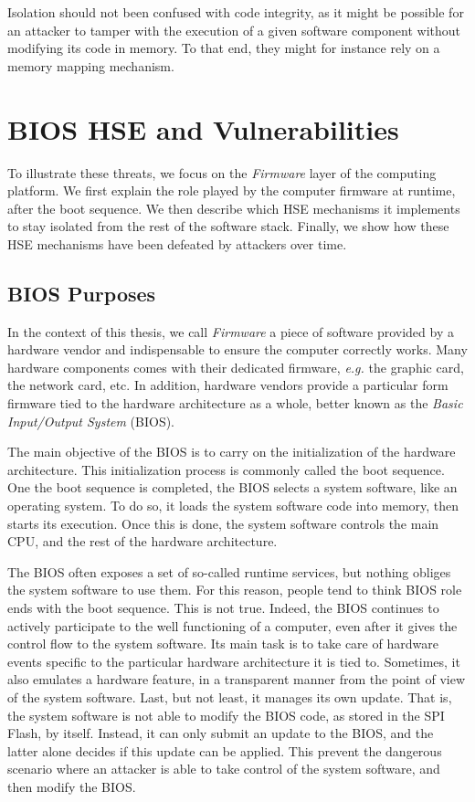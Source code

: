 Isolation should not been confused with code integrity, as it might be possible
for an attacker to tamper with the execution of a given software component
without modifying its code in memory.
%
To that end, they might for instance rely on a memory mapping mechanism.


\section{BIOS HSE and Vulnerabilities}
\label{sec:usecase:firmware}

To illustrate these threats, we focus on the \emph{Firmware} layer of the
computing platform.
%
We first explain the role played by the computer firmware at runtime, after the
boot sequence.
%
We then describe which HSE mechanisms it implements to stay isolated from the
rest of the software stack.
%
Finally, we show how these HSE mechanisms have been defeated by attackers over
time.

\subsection{BIOS Purposes}

In the context of this thesis, we call \emph{Firmware} a piece of software
provided by a hardware vendor and indispensable to ensure the computer correctly
works.
%
Many hardware components comes with their dedicated firmware, \emph{e.g.} the
graphic card, the network card, etc.
%
In addition, hardware vendors provide a particular form firmware tied to the
hardware architecture as a whole, better known as the \emph{Basic Input/Output
  System} (BIOS). %

The main objective of the BIOS is to carry on the initialization of the hardware
architecture.
%
This initialization process is commonly called the boot sequence.
%
One the boot sequence is completed, the BIOS selects a system software, like an
operating system.
%
To do so, it loads the system software code into memory, then starts its
execution.
%
Once this is done, the system software controls the main CPU, and the rest of
the hardware architecture.

The BIOS often exposes a set of so-called runtime services, but nothing obliges
the system software to use them.
%
For this reason, people tend to think BIOS role ends with the boot sequence.
%
This is not true.
%
Indeed, the BIOS continues to actively participate to the well functioning of a
computer, even after it gives the control flow to the system software.
%
Its main task is to take care of hardware events specific to the particular
hardware architecture it is tied to.
%
Sometimes, it also emulates a hardware feature, in a transparent manner from the
point of view of the system software.  
%
Last, but not least, it manages its own update.
%
That is, the system software is not able to modify the BIOS code, as stored in
the SPI Flash, by itself.
%
Instead, it can only submit an update to the BIOS, and the latter alone decides
if this update can be applied.
%
This prevent the dangerous scenario where an attacker is able to take control of
the system software, and then modify the BIOS.

